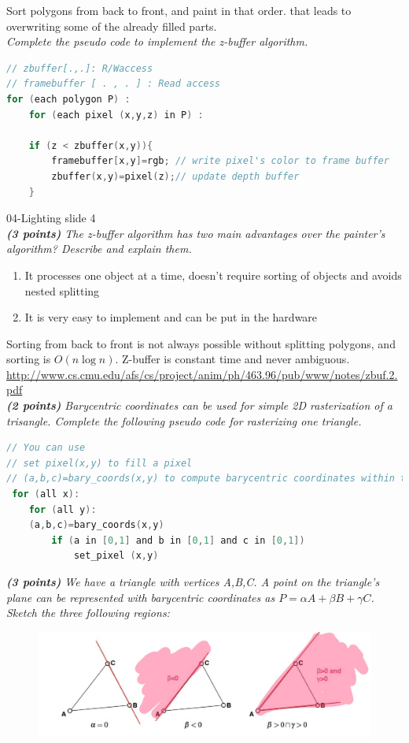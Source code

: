 \documentclass[a4paper,10pt]{article}
\begin{document}
Sort polygons from back to front, and paint in that order. that leads to overwriting some of the already
filled parts.\\

\textit{ Complete the pseudo code to implement the z-buffer algorithm.}\\

\begin{lstlisting}[language=C]
// zbuffer[.,.]: R/Waccess
// framebuffer [ . , . ] : Read access
for (each polygon P) :
	for (each pixel (x,y,z) in P) :

	if (z < zbuffer(x,y)){
		framebuffer[x,y]=rgb; // write pixel's color to frame buffer
		zbuffer(x,y)=pixel(z);// update depth buffer
	}
\end{lstlisting}
04-Lighting slide 4\\

\textit{\textbf{(3 points)} The z-buffer algorithm has two main advantages over the painter’s algorithm? Describe and explain them.}
\begin{enumerate}
	\item It processes one object at a time, doesn’t require sorting of objects and avoids nested splitting
	\item It is very easy to implement and can be put in the hardware
\end{enumerate}

Sorting from back to front is not always possible without splitting polygons, and sorting is  $O(n \log n)$. Z-buffer is constant time and never ambiguous.\\

\url{http://www.cs.cmu.edu/afs/cs/project/anim/ph/463.96/pub/www/notes/zbuf.2.pdf}\\

\textit{\textbf{(2 points)} Barycentric coordinates can be used for simple 2D rasterization of a trisangle. Complete the following pseudo code for rasterizing one triangle.}\\
\begin{lstlisting}[language=C]
// You can use
// set pixel(x,y) to fill a pixel
// (a,b,c)=bary_coords(x,y) to compute barycentric coordinates within the triangle
 for (all x): 
 	for (all y):
 	(a,b,c)=bary_coords(x,y)
		if (a in [0,1] and b in [0,1] and c in [0,1])
			set_pixel (x,y)
\end{lstlisting}

\textit{\textbf{(3 points)} We have a triangle with vertices A,B,C. A point on the triangle’s plane can be represented with barycentric coordinates as $P = \alpha A + \beta B + \gamma C$. Sketch the three following regions:}
\begin{figure}[H]
	\centering
	\includegraphics[width=.7\textwidth]{3-textures}
\end{figure}
\end{document}
